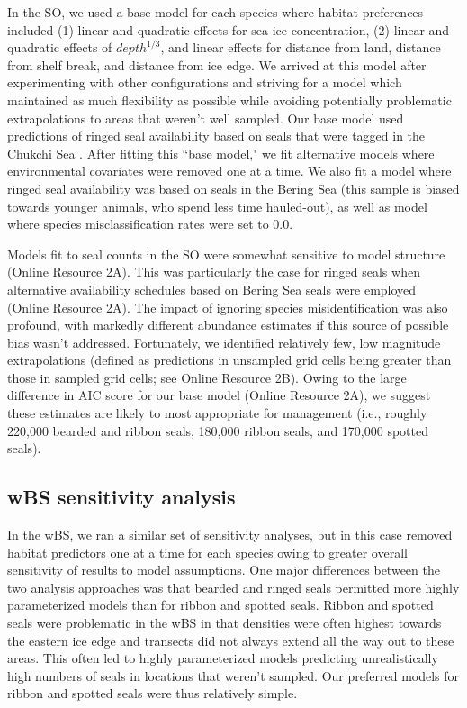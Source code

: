 \documentclass{svjour3}
\begin{document}
In the SO, we used a base model for each species where habitat preferences included (1) linear and quadratic effects for sea ice concentration, (2) linear and quadratic effects of $depth^{1/3}$, and linear effects for distance from land, distance from shelf break, and distance from ice edge.  We arrived at this model after experimenting with other configurations and striving for a model which maintained as much flexibility as possible while avoiding potentially problematic extrapolations to areas that weren't well sampled.  Our base model used predictions of ringed seal availability based on seals that were tagged in the Chukchi Sea \citep{LondonEtAl2022}.  After fitting this ``base model," we fit alternative models where environmental covariates were removed one at a time.  We also fit a model where ringed seal availability was based on seals in the Bering Sea (this sample is biased towards younger animals, who spend less time hauled-out), as well as model where species misclassification rates were set to 0.0.

Models fit to seal counts in the SO were somewhat sensitive to model structure (Online Resource 2A).  This was particularly the case for ringed seals when alternative availability schedules based on Bering Sea seals were employed (Online Resource 2A).  The impact of ignoring species misidentification was also profound, with markedly different abundance estimates if this source of possible bias wasn't addressed.  Fortunately, we identified relatively few, low magnitude extrapolations (defined as predictions in unsampled grid cells being greater than those in sampled grid cells; see Online Resource 2B).  Owing to the large difference in AIC score for our base model (Online Resource 2A), we suggest these estimates are likely to most appropriate for management (i.e., roughly 220,000 bearded and ribbon seals, 180,000 ribbon seals, and 170,000 spotted seals).

\subsection*{wBS sensitivity analysis}

In the wBS, we ran a similar set of sensitivity analyses, but in this case removed habitat predictors one at a time for each species owing to greater overall sensitivity of results to model assumptions.  One major differences between the two analysis approaches was that bearded and ringed seals permitted more highly parameterized models than for ribbon and spotted seals. Ribbon and spotted seals were problematic in the wBS in that densities were often highest towards the eastern ice edge and transects did not always extend all the way out to these areas.  This often led to highly parameterized models predicting unrealistically high numbers of seals in locations that weren't sampled.  Our preferred models for ribbon and spotted seals were thus relatively simple.
\end{document}
